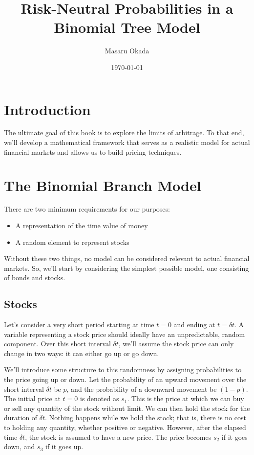 \documentclass[uplatex,a4j,12pt,dvipdfmx]{jsarticle}
\title{
Risk-Neutral Probabilities in a Binomial Tree Model
}
\author{Masaru Okada}
\date{\today}
\begin{document}
\maketitle

\tableofcontents

\newpage

\section{Introduction}
The ultimate goal of this book is to explore the limits of arbitrage. To that end, we'll develop a mathematical framework that serves as a realistic model for actual financial markets and allows us to build pricing techniques.

\section{The Binomial Branch Model}
There are two minimum requirements for our purposes:
\begin{itemize}
	\item A representation of the time value of money
	\item A random element to represent stocks
\end{itemize}
Without these two things, no model can be considered relevant to actual financial markets. So, we'll start by considering the simplest possible model, one consisting of bonds and stocks.

\subsection{Stocks}
Let's consider a very short period starting at time $t=0$ and ending at $t=\delta t$. A variable representing a stock price should ideally have an unpredictable, random component. Over this short interval $\delta t$, we'll assume the stock price can only change in two ways: it can either go up or go down.

We'll introduce some structure to this randomness by assigning probabilities to the price going up or down. Let the probability of an upward movement over the short interval $\delta t$ be $p$, and the probability of a downward movement be $(1-p)$. The initial price at $t=0$ is denoted as $s_1$. This is the price at which we can buy or sell any quantity of the stock without limit. We can then hold the stock for the duration of $\delta t$. Nothing happens while we hold the stock; that is, there is no cost to holding any quantity, whether positive or negative. However, after the elapsed time $\delta t$, the stock is assumed to have a new price. The price becomes $s_2$ if it goes down, and $s_3$ if it goes up.
\end{document}
